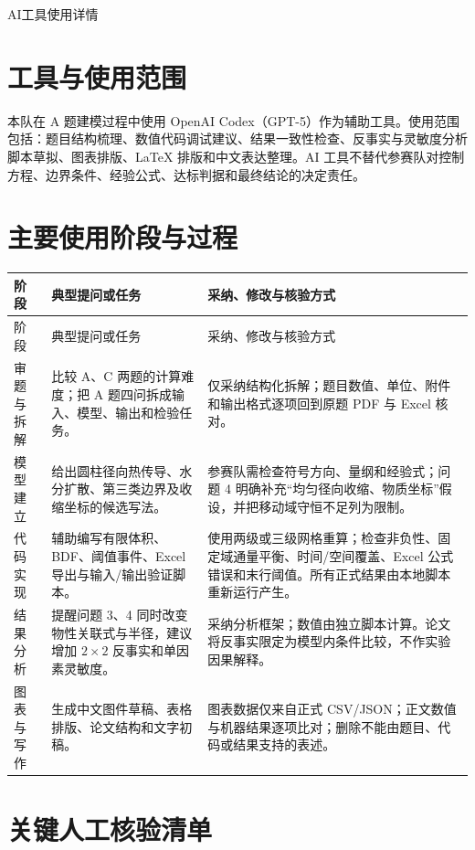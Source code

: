 \documentclass[UTF8,a4paper,zihao=-4,fontset=fandol]{ctexart}
\begin{document}
\pagestyle{plain}
\begin{center}
{\heiti{} AI工具使用详情}
\end{center}

\section{工具与使用范围}

本队在 A 题建模过程中使用 OpenAI Codex（GPT-5）作为辅助工具。使用范围包括：题目结构梳理、数值代码调试建议、结果一致性检查、反事实与灵敏度分析脚本草拟、图表排版、LaTeX 排版和中文表达整理。AI 工具不替代参赛队对控制方程、边界条件、经验公式、达标判据和最终结论的决定责任。

\section{主要使用阶段与过程}

\begin{longtable}{L{2.2cm}L{4.0cm}L{5.6cm}}
\toprule
阶段 & 典型提问或任务 & 采纳、修改与核验方式 \\
\midrule
\endfirsthead
\toprule
阶段 & 典型提问或任务 & 采纳、修改与核验方式 \\
\midrule
\endhead
审题与拆解 & 比较 A、C 两题的计算难度；把 A 题四问拆成输入、模型、输出和检验任务。 & 仅采纳结构化拆解；题目数值、单位、附件和输出格式逐项回到原题 PDF 与 Excel 核对。 \\
模型建立 & 给出圆柱径向热传导、水分扩散、第三类边界及收缩坐标的候选写法。 & 参赛队需检查符号方向、量纲和经验式；问题 4 明确补充“均匀径向收缩、物质坐标”假设，并把移动域守恒不足列为限制。 \\
代码实现 & 辅助编写有限体积、BDF、阈值事件、Excel 导出与输入/输出验证脚本。 & 使用两级或三级网格重算；检查非负性、固定域通量平衡、时间/空间覆盖、Excel 公式错误和末行阈值。所有正式结果由本地脚本重新运行产生。 \\
结果分析 & 提醒问题 3、4 同时改变物性关联式与半径，建议增加 $2\times2$ 反事实和单因素灵敏度。 & 采纳分析框架；数值由独立脚本计算。论文将反事实限定为模型内条件比较，不作实验因果解释。 \\
图表与写作 & 生成中文图件草稿、表格排版、论文结构和文字初稿。 & 图表数据仅来自正式 CSV/JSON；正文数值与机器结果逐项比对；删除不能由题目、代码或结果支持的表述。 \\
\bottomrule
\end{longtable}

\section{关键人工核验清单}
\end{document}
